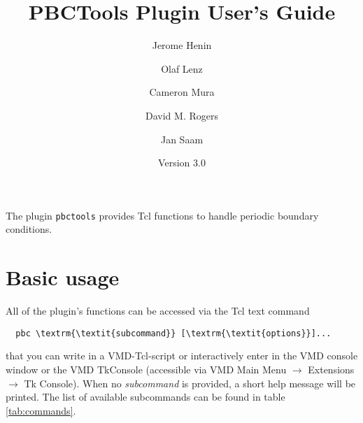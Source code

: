 \documentclass[a4paper, DIV12]{scrartcl}
\newcommand{\pbctools}{PBCTools\xspace}
\begin{document}
\title{\pbctools Plugin User's Guide}
\author{Jerome Henin \and Olaf Lenz \and Cameron Mura \and David M. Rogers \and Jan Saam}
\date{Version 3.0}

\maketitle

The plugin \texttt{pbctools} provides Tcl functions to handle periodic
boundary conditions. 

\section{Basic usage}
All of the plugin's functions can be accessed via the Tcl text command

\begin{Verbatim}
  pbc \textrm{\textit{subcommand}} [\textrm{\textit{options}}]...
\end{Verbatim}

\noindent that you can write in a VMD-Tcl-script or interactively
enter in the VMD console window or the VMD TkConsole (accessible via
VMD Main Menu $\rightarrow$ Extensions $\rightarrow$ Tk Console).
When no \textit{subcommand} is provided, a short help message will be
printed. The list of available subcommands can be found in table
\ref{tab:commands}.
\end{document}
